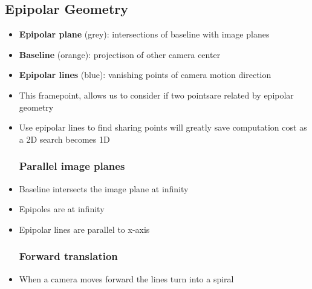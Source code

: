 \subsection{Epipolar Geometry}
\begin{itemize}
	\item \textbf{Epipolar plane} (grey): intersections of baseline with image planes
	\item \textbf{Baseline} (orange): projectison of other camera center
	\item \textbf{Epipolar lines} (blue): vanishing points of camera motion direction
	\item This framepoint, allows us to consider if two pointsare related by epipolar geometry
	\item Use epipolar lines to find sharing points will greatly save computation cost as a 2D search becomes 1D
	\subsubsection{Parallel image planes}
	\item Baseline intersects the image plane at infinity
	\item Epipoles are at infinity
	\item Epipolar lines are parallel to x-axis
	\subsubsection{Forward translation}
	\item When a camera moves forward the lines turn into a spiral
\end{itemize}